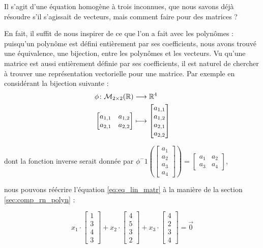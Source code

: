 Il s'agit d'une équation homogène à trois inconnues, que nous savons déjà résoudre s'il s'agissait de vecteurs, mais comment faire pour des matrices ?

En fait, il suffit de nous inspirer de ce que l'on a fait avec les polynômes : puisqu'un polynôme est défini entièrement par ses coefficients, nous avons trouvé une équivalence, une bijection, entre les polynômes et les vecteurs. Vu qu'une matrice est aussi entièrement définie par ses coefficients, il est naturel de chercher à trouver une représentation vectorielle pour une matrice. Par exemple en considérant la bijection suivante :
\begin{align*}
    \phi \colon \mathcal{M}_{2\times 2}(\mathbb{R}) & \longrightarrow\mathbb{R}^4\\
    \begin{bmatrix}a_{1,1} & a_{1,2}\\ a_{2,1} & a_{2,2}\end{bmatrix} & \longmapsto \begin{bmatrix}a_{1,1}\\a_{1,2}\\a_{2,1}\\a_{2,2}\end{bmatrix}  
\end{align*}

dont la fonction inverse serait donnée par $\phi^-1(\begin{bmatrix}a_1\\a_2\\a_3\\a_4\end{bmatrix}) = 
\begin{bmatrix}
a_1 & a_2\\
a_3 & a_4
\end{bmatrix}$,

nous pouvons réécrire l'équation \ref{eq:eq_lin_matr} à la manière de la section \ref{sec:comp_rn_polyn} :

\begin{equation*}
    x_1\cdot\begin{bmatrix}1\\3\\4\\3\end{bmatrix} + x_2\cdot\begin{bmatrix}4\\5\\3\\2\end{bmatrix} + x_3\cdot\begin{bmatrix}4\\2\\3\\4\end{bmatrix} = \vec{0}
\end{equation*}

